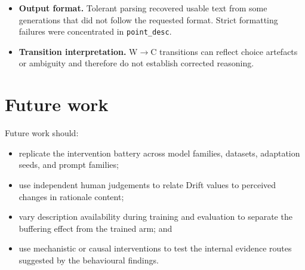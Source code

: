 \begin{itemize}
  \item \textbf{Output format.} Tolerant parsing recovered usable text from
        some generations that did not follow the requested format. Strict
        formatting failures were concentrated in \texttt{point\_desc}.

  \item \textbf{Transition interpretation.} W$\rightarrow$C transitions can
        reflect choice artefacts or ambiguity and therefore do not establish
        corrected reasoning.
\end{itemize}

\section{Future work}
\label{sec:discussion-future}

Future work should:

\begin{itemize}
  \item replicate the intervention battery across model families, datasets,
        adaptation seeds, and prompt families;

  \item use independent human judgements to relate Drift values to perceived
        changes in rationale content;

  \item vary description availability during training and evaluation to
        separate the buffering effect from the trained arm; and

  \item use mechanistic or causal interventions to test the internal evidence
        routes suggested by the behavioural findings.
\end{itemize}
